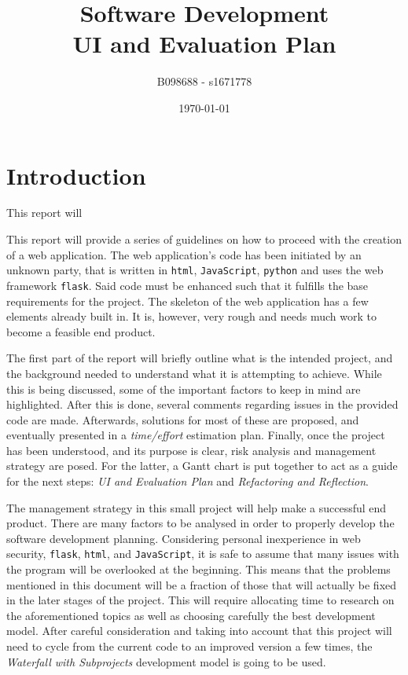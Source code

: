 \documentclass[12pt,a4paper]{article}
\begin{document}
\title{Software Development\\UI and Evaluation Plan}
\author{B098688 - s1671778}
\date{\today}

\makeEPCCtitle

\thispagestyle{empty}

\newpage


\tableofcontents


\newpage
{}

\section{Introduction}

This report will 

This report will provide a series of guidelines on how to proceed with the creation of a web application. The web application's code has been initiated by an unknown party, that is written in \texttt{html}, \texttt{JavaScript}, \texttt{python} and uses the web framework \texttt{flask}. Said code must be enhanced such that it fulfills the base requirements for the project. The skeleton of the web application has a few elements already built in. It is, however, very rough and needs much work to become a feasible end product. 

The first part of the report will briefly outline what is the intended project, and the background needed to understand what it is attempting to achieve. While this is being discussed, some of the important factors to keep in mind are highlighted. After this is done, several comments regarding issues in the provided code are made. Afterwards, solutions for most of these are proposed, and eventually presented in a \textit{time/effort} estimation plan. Finally, once the project has been understood, and its purpose is clear, risk analysis and management strategy are posed. For the latter, a Gantt chart is put together to act as a guide for the next steps: \textit{UI and Evaluation Plan} and \textit{Refactoring and Reflection}.

The management strategy in this small project will help make a successful end product. There are many factors to be analysed in order to properly develop the software development planning. Considering personal inexperience in web security, \texttt{flask}, \texttt{html}, and \texttt{JavaScript}, it is safe to assume that many issues with the program will be overlooked at the beginning. This means that the problems mentioned in this document will be a fraction of those that will actually be fixed in the later stages of the project. This will require allocating time to research on the aforementioned topics as well as choosing carefully the best development model. After careful consideration and taking into account that this project will need to cycle from the current code to an improved version a few times, the \textit{Waterfall with Subprojects} development model is going to be used.
\end{document}
